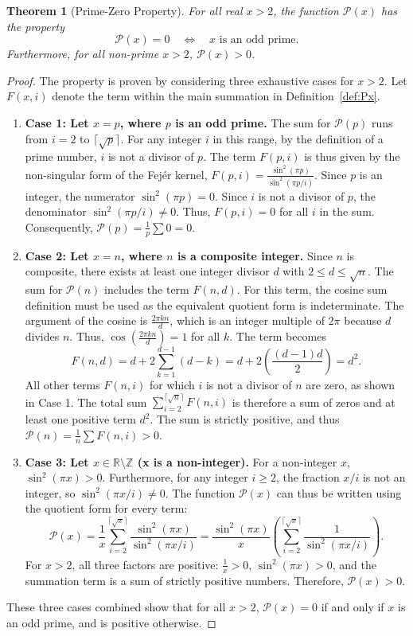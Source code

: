 \documentclass[11pt,a4paper]{amsart}
\newcommand{\Px}{\mathcal{P}}
\theoremstyle{plain}
\newtheorem{theorem}{Theorem}[section]
\theoremstyle{definition}
\begin{document}
\begin{theorem}[Prime-Zero Property]\label{thm:primezero}
For all real $x>2$, the function $\Px(x)$ has the property
\[
\Px(x)=0 \quad\Longleftrightarrow\quad x \text{ is an odd prime}.
\]
Furthermore, for all non-prime $x>2$, $\Px(x) > 0$.
\end{theorem}

\begin{proof}
The property is proven by considering three exhaustive cases for $x > 2$. Let $F(x,i)$ denote the term within the main summation in Definition~\ref{def:Px}.
\begin{enumerate}
  \item \textbf{Case 1: Let $x = p$, where $p$ is an odd prime.}
  The sum for $\Px(p)$ runs from $i=2$ to $\lceil\sqrt{p}\rceil$. For any integer $i$ in this range, by the definition of a prime number, $i$ is not a divisor of $p$. The term $F(p, i)$ is thus given by the non-singular form of the Fejér kernel, $F(p, i) = \frac{\sin^2(\pi p)}{\sin^2(\pi p/i)}$. Since $p$ is an integer, the numerator $\sin^2(\pi p) = 0$. Since $i$ is not a divisor of $p$, the denominator $\sin^2(\pi p/i) \neq 0$. Thus, $F(p, i) = 0$ for all $i$ in the sum. Consequently, $\Px(p) = \frac{1}{p}\sum 0 = 0$.

  \item \textbf{Case 2: Let $x = n$, where $n$ is a composite integer.}
  Since $n$ is composite, there exists at least one integer divisor $d$ with $2 \le d \le \sqrt{n}$. The sum for $\Px(n)$ includes the term $F(n, d)$. For this term, the cosine sum definition must be used as the equivalent quotient form is indeterminate. The argument of the cosine is $\frac{2\pi k n}{d}$, which is an integer multiple of $2\pi$ because $d$ divides $n$. Thus, $\cos(\frac{2\pi k n}{d}) = 1$ for all $k$. The term becomes
  \[ F(n, d) = d + 2\sum_{k=1}^{d-1}(d-k) = d + 2\left(\frac{(d-1)d}{2}\right) = d^2. \]
  All other terms $F(n, i)$ for which $i$ is not a divisor of $n$ are zero, as shown in Case 1. The total sum $\sum_{i=2}^{\lceil\sqrt{n}\rceil} F(n, i)$ is therefore a sum of zeros and at least one positive term $d^2$. The sum is strictly positive, and thus $\Px(n) = \frac{1}{n} \sum F(n, i) > 0$.

  \item \textbf{Case 3: Let $x \in \mathbb{R} \setminus \mathbb{Z}$ (x is a non-integer).}
  For a non-integer $x$, $\sin^2(\pi x) > 0$. Furthermore, for any integer $i \ge 2$, the fraction $x/i$ is not an integer, so $\sin^2(\pi x/i) \neq 0$. The function $\Px(x)$ can thus be written using the quotient form for every term:
  \[ \Px(x) = \frac{1}{x} \sum_{i=2}^{\lceil\sqrt{x}\rceil} \frac{\sin^2(\pi x)}{\sin^2(\pi x/i)} = \frac{\sin^2(\pi x)}{x} \left( \sum_{i=2}^{\lceil\sqrt{x}\rceil} \frac{1}{\sin^2(\pi x/i)} \right). \]
  For $x>2$, all three factors are positive: $\frac{1}{x} > 0$, $\sin^2(\pi x) > 0$, and the summation term is a sum of strictly positive numbers. Therefore, $\Px(x) > 0$.
\end{enumerate}
These three cases combined show that for all $x>2$, $\Px(x)=0$ if and only if $x$ is an odd prime, and is positive otherwise.
\end{proof}
\end{document}
